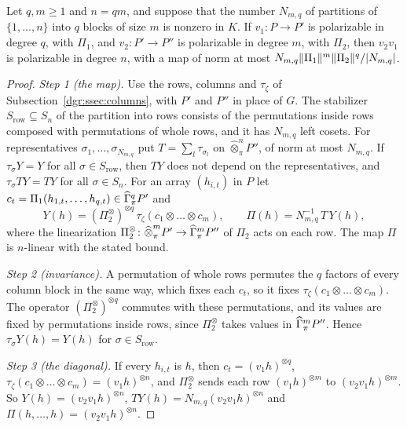 \begin{lemma}\label{dgr:lem:polarizable-composition}
Let $q,m\ge1$ and $n=qm$, and suppose that the number $N_{m,q}$ of partitions of $\{1,\dots,n\}$ into $q$ blocks of size
$m$ is nonzero in $K$. If $v_1\colon P\to P'$ is polarizable in degree $q$, with $\Pi_1$, and $v_2\colon P'\to P''$ is
polarizable in degree $m$, with $\Pi_2$, then $v_2v_1$ is polarizable in degree $n$, with a map of norm at most
$N_{m,q}\lVert \Pi_1\rVert^m\lVert \Pi_2\rVert^q/\lvert N_{m,q}\rvert$.
\end{lemma}

\begin{proof}
\emph{Step 1 (the map).} Use the rows, columns and $\tau_\zeta$ of Subsection~\ref{dgr:ssec:columns}, with $P'$ and
$P''$ in place of $G$. The stabilizer $S_{\mathrm{row}}\subseteq S_n$ of the partition into rows consists of the
permutations inside rows composed with permutations of whole rows, and it has $N_{m,q}$ left cosets. For representatives $\sigma_1,\dots,\sigma_{N_{m,q}}$ put
$T=\sum_l\tau_{\sigma_l}$ on $\widehat\otimes^n_\pi P''$, of norm at most $N_{m,q}$. If $\tau_\sigma Y=Y$ for all
$\sigma\in S_{\mathrm{row}}$, then $TY$ does not depend on the representatives, and $\tau_\sigma TY=TY$ for all
$\sigma\in S_n$. For an array $(h_{i,t})$ in $P$ let $c_t=\Pi_1(h_{1,t},\dots,h_{q,t})\in\widehat\Gamma^q_\pi P'$ and
\[
 Y(h)=(\Pi_2^\otimes)^{\otimes q}\,\tau_\zeta(c_1\otimes\dots\otimes c_m),\qquad \Pi(h)=N_{m,q}^{-1}\,T\,Y(h),
\]
where the linearization $\Pi_2^\otimes\colon\widehat\otimes^m_\pi P'\to\widehat\Gamma^m_\pi P''$ of $\Pi_2$ acts on each row.
The map $\Pi$ is $n$-linear with the stated bound.

\emph{Step 2 (invariance).} A permutation of whole rows permutes the $q$ factors of every column block in the same way,
which fixes each $c_t$, so it fixes $\tau_\zeta(c_1\otimes\dots\otimes c_m)$. The operator $(\Pi_2^\otimes)^{\otimes q}$
commutes with these permutations, and its values are fixed by permutations inside rows, since $\Pi_2^\otimes$ takes values
in $\widehat\Gamma^m_\pi P''$. Hence $\tau_\sigma Y(h)=Y(h)$ for $\sigma\in S_{\mathrm{row}}$.

\emph{Step 3 (the diagonal).} If every $h_{i,t}$ is $h$, then $c_t=(v_1h)^{\otimes q}$,
$\tau_\zeta(c_1\otimes\dots\otimes c_m)=(v_1h)^{\otimes n}$, and $\Pi_2^\otimes$ sends each row $(v_1h)^{\otimes m}$ to
$(v_2v_1h)^{\otimes m}$. So $Y(h)=(v_2v_1h)^{\otimes n}$, $TY(h)=N_{m,q}(v_2v_1h)^{\otimes n}$ and
$\Pi(h,\dots,h)=(v_2v_1h)^{\otimes n}$.


\end{proof}
